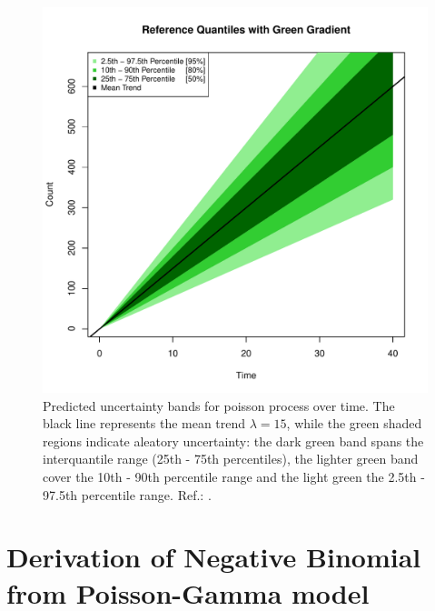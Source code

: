 \begin{figure}
\begin{knitrout}
\color{fgcolor}

{\centering \includegraphics[width=\textwidth-3cm]{figure/ch02_figunnamed-chunk-4-1} 

}


\end{knitrout}
  \caption{Predicted uncertainty bands for poisson process over time. The black line represents the mean trend $\lambda = 15$, while the green shaded regions indicate aleatory uncertainty: the dark green band spans the interquantile range (25th - 75th percentiles), the lighter green band cover the 10th - 90th percentile range and the light green the 2.5th - 97.5th percentile range. Ref.: \cite{spiegelhalter2011visualizing}.}
  \label{fig:2_3}
\end{figure}



\section{Derivation of Negative Binomial from Poisson-Gamma model}


